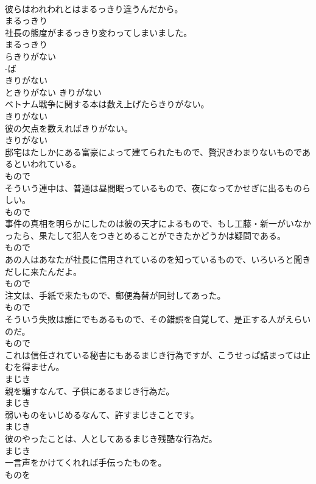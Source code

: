 \documentclass[8pt]{extreport}
\begin{document}
\begin{CJK}{UTF8}{min}
\\	彼らはわれわれとはまるっきり違うんだから。	
\\	まるっきり
\\	社長の態度がまるっきり変わってしまいました。	
\\	まるっきり
\\	らきりがない	
\\	-ば
\\	きりがない	
\\	ときりがない	きりがない
\\	ベトナム戦争に関する本は数え上げたらきりがない。	
\\	きりがない
\\	彼の欠点を数えればきりがない。	
\\	きりがない
\\	邸宅はたしかにある富豪によって建てられたもので、贅沢きわまりないものであるといわれている。	
\\	もので
\\	そういう連中は、普通は昼間眠っているもので、夜になってかせぎに出るものらしい。	
\\	もので
\\	事件の真相を明らかにしたのは彼の天才によるもので、もし工藤・新一がいなかったら、果たして犯人をつきとめることができたかどうかは疑問である。	
\\	もので
\\	あの人はあなたが社長に信用されているのを知っているもので、いろいろと聞きだしに来たんだよ。	
\\	もので
\\	注文は、手紙で来たもので、郵便為替が同封してあった。	
\\	もので
\\	そういう失敗は誰にでもあるもので、その錯誤を自覚して、是正する人がえらいのだ。	
\\	もので
\\	これは信任されている秘書にもあるまじき行為ですが、こうせっぱ詰まっては止むを得ません。	
\\	まじき
\\	親を騙すなんて、子供にあるまじき行為だ。	
\\	まじき
\\	弱いものをいじめるなんて、許すまじきことです。	
\\	まじき
\\	彼のやったことは、人としてあるまじき残酷な行為だ。	
\\	まじき
\\	一言声をかけてくれれば手伝ったものを。	
\\	ものを

\end{CJK}
\end{document}
